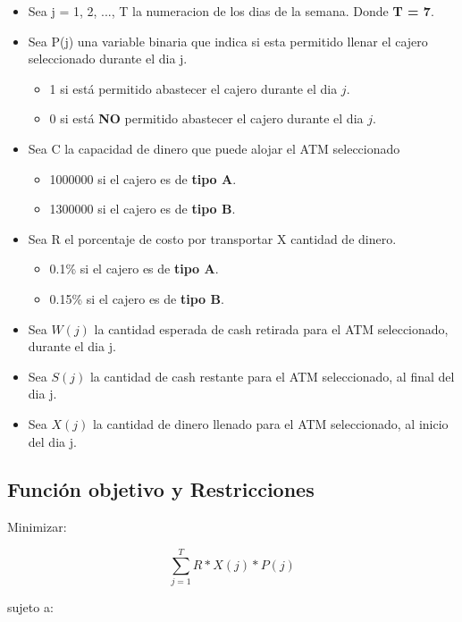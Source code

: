 \documentclass{article}
\begin{document}
\begin{itemize}
    \item Sea j = 1, 2, ..., T la numeracion de los dias de la semana. Donde \textbf{T = 7}.
    \item Sea P(j) una variable binaria que indica si esta permitido llenar el cajero seleccionado durante el dia j.
    \begin{itemize}
        \item 1 si está permitido abastecer el cajero durante el dia $j$.
        \item 0 si está \textbf{NO} permitido abastecer el cajero durante el dia $j$.
    \end{itemize}
    \item Sea C la capacidad de dinero que puede alojar el ATM seleccionado
    \begin{itemize}
        \item 1000000 si el cajero es de \textbf{tipo A}.
        \item 1300000 si el cajero es de \textbf{tipo B}.
    \end{itemize}
    \item Sea R el porcentaje de costo por transportar X cantidad de dinero.
    \begin{itemize}
        \item 0.1\% si el cajero es de \textbf{tipo A}.
        \item 0.15\% si el cajero es de \textbf{tipo B}.
    \end{itemize}
    \item Sea $W(j)$ la cantidad esperada de cash retirada para el ATM seleccionado, durante el dia j.
    \item Sea $S(j)$ la cantidad de cash restante para el ATM seleccionado, al final del dia j.
    \item Sea $X(j)$ la cantidad de dinero llenado para el ATM seleccionado, al inicio del dia j.
\end{itemize}

\subsection{Función objetivo y Restricciones}

Minimizar:

$$
\sum_{j=1}^{T} R * X(j) * P(j)
$$

sujeto a:
\end{document}
